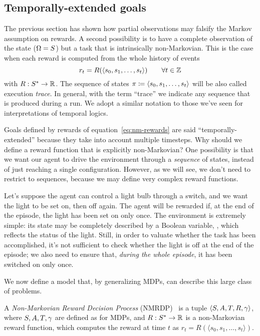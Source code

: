 \subsection{Temporally-extended goals}

\label{sec:tempoal-goals}

The previous section has shown how partial observations may falsify the Markov
assumption on rewards. A second possibility is to have a complete observation
of the state ($\Omega = S$) but a task that is intrinsically
non-Markovian. This is the case when each reward is computed from the whole
history of events
\begin{equation}
	r_t = R(\langle s_0, s_1, \dots, s_t \rangle) \qquad \forall t \in \mathbb{Z}
	\label{eq:nm-rewards}
\end{equation}
with $R: S^* \to \mathbb{R}$. The sequence of states $\pi
\coloneqq \langle s_0, s_1, \dots, s_t \rangle$ will be also called
execution \emph{trace}. In general, with the term ``trace'' we indicate any
sequence that is produced during a run. We adopt a similar notation to those
we've seen for interpretations of temporal logics.

Goals defined by rewards of equation~\eqref{eq:nm-rewards} are said
``temporally-extended'' because they take into account multiple timesteps. Why
should we define a reward function that is explicitly non-Markovian? One
possibility is that we want our agent to drive the environment through a
\emph{sequence} of states, instead of just reaching a single configuration.
However, as we will see, we don't need to restrict to sequences, because we
may define very complex reward functions.

\begin{example}
	Let's suppose the agent can control a light bulb through a switch, and we
	want the light to be set on, then off again. The agent will be rewarded if,
	at the end of the episode, the light has been set on only once.  The
	environment is extremely simple: its state may be completely described by a
	Boolean variable, , which reflects the status of the light.
	Still, in order to valuate whether the task has been accomplished, it's not
	sufficient to check whether the light is off at the end of the episode; we
	also need to ensure that, \emph{during the whole episode}, it has been
	switched on only once.
	\label{ex:light}
\end{example}

We now define a model that, by generalizing MDPs, can describe this large
class of problems.
\begin{definition}
	A \emph{Non-Markovian Reward Decision Process}
	(NMRDP)~\cite{bib:nmrdp-logic-first} is a tuple $\langle S, A, T, R,
	\gamma \rangle$, where $S, A, T, \gamma$ are defined as for
	MDPs, and $R: S^* \to \mathbb{R}$ is a non-Markovian reward function, which
	computes the reward at time $t$ as $r_t = R(\langle s_0, s_1, \dots, s_t
	\rangle)$.
\end{definition}

